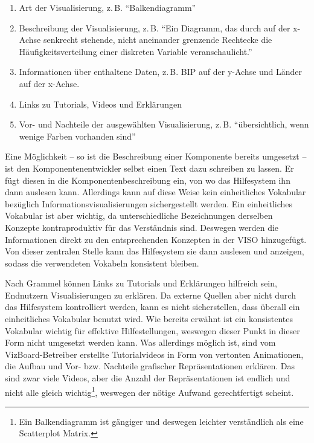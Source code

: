 \documentclass[
	headsepline,
	footsepline,
	fontsize=12pt,
	bibliography=totoc
]{scrbook}
\begin{document}
\begin{enumerate}
	\item Art der Visualisierung, z.\,B. \enquote{Balkendiagramm}
	\item Beschreibung der Visualisierung, z.\,B. \enquote{Ein Diagramm, das durch auf der x-Achse senkrecht stehende, nicht aneinander grenzende Rechtecke die Häufigkeitsverteilung einer diskreten Variable veranschaulicht.}
	\item Informationen über enthaltene Daten, z.\,B. BIP auf der y-Achse und Länder auf der x-Achse.
	\item Links zu Tutorials, Videos und Erklärungen
	\item Vor- und Nachteile der ausgewählten Visualisierung, z.\,B. \enquote{übersichtlich, wenn wenige Farben vorhanden sind}
\end{enumerate}

Eine Möglichkeit -- so ist die Beschreibung einer Komponente bereits umgesetzt -- ist den Komponentenentwickler selbst einen Text dazu schreiben zu lassen. Er fügt diesen in die Komponentenbeschreibung ein, von wo das Hilfesystem ihn dann auslesen kann. Allerdings kann auf diese Weise kein einheitliches Vokabular bezüglich Informationsvisualisierungen sichergestellt werden. Ein einheitliches Vokabular ist aber wichtig, da unterschiedliche Bezeichnungen derselben Konzepte kontraproduktiv für das Verständnis sind. Deswegen werden die Informationen direkt zu den entsprechenden Konzepten in der VISO hinzugefügt. Von dieser zentralen Stelle kann das Hilfesystem sie dann auslesen und anzeigen, sodass die verwendeten Vokabeln konsistent bleiben.


Nach Grammel \cite{Grammel2012} können Links zu Tutorials und Erklärungen hilfreich sein, Endnutzern Visualisierungen zu erklären. Da externe Quellen aber nicht durch das Hilfesystem kontrolliert werden, kann es nicht sicherstellen, dass überall ein einheitliches Vokabular benutzt wird. Wie bereits erwähnt ist ein konsistentes Vokabular wichtig für effektive Hilfestellungen, weswegen dieser Punkt in dieser Form nicht umgesetzt werden kann. Was allerdings möglich ist, sind vom VizBoard-Betreiber erstellte Tutorialvideos in Form von vertonten Animationen, die Aufbau und Vor- bzw. Nachteile grafischer Repräsentationen erklären. Das sind zwar viele Videos, aber die Anzahl der Repräsentationen ist endlich und nicht alle gleich wichtig\footnote{Ein Balkendiagramm ist gängiger und deswegen leichter verständlich als eine Scatterplot Matrix.}, weswegen der nötige Aufwand gerechtfertigt scheint.
\end{document}
